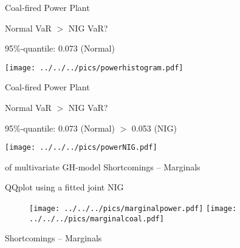 \begin{figure}[htp]
Coal-fired Power Plant %


\begin{center}
Normal VaR $>$ NIG VaR? 
\par\end{center}

95\%-quantile: \hspace{1cm} 0.073 (Normal) \hspace{1cm} \\


\begin{center}
\texttt{[image: ../../../pics/powerhistogram.pdf]} 
\par\end{center}

Coal-fired Power Plant %


\begin{center}
Normal VaR $>$ NIG VaR? 
\par\end{center}

95\%-quantile: \hspace{1cm} 0.073 (Normal) \hspace{1cm}$>$ \hspace{1cm}
0.053 (NIG) \\


\begin{center}
\texttt{[image: ../../../pics/powerNIG.pdf]} 
\par\end{center}

 \subsubsectionDiscussion of multivariate GH-model %
Shortcomings -- Marginals %


\begin{center}
QQplot using a fitted joint NIG 
\begin{figure}
\centering{}\texttt{[image: ../../../pics/marginalpower.pdf]}
\texttt{[image: ../../../pics/marginalcoal.pdf]} 
\end{figure}

\par\end{center}

 Shortcomings -- Marginals %



\end{figure}
